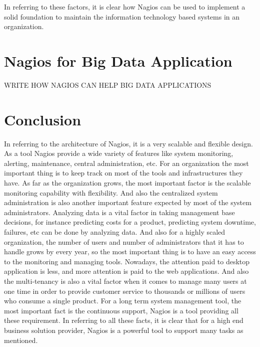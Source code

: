 \documentclass[9pt,twocolumn,twoside]{styles/osajnl}
\begin{document}
In referring to these factors, it is clear how Nagios can be used to
implement a solid foundation to maintain the information technology
based systems in an organization.

\section{Nagios for Big Data Application}

WRITE HOW NAGIOS CAN HELP BIG DATA APPLICATIONS

\section{Conclusion}

In referring to the architecture of Nagios, it is a very scalable and
flexible design. As a tool Nagios provide a wide variety of features
like system monitoring, alerting, maintenance, central administration,
etc. For an organization the most important thing is to keep track on
most of the tools and infrastructures they have. As far as the
organization grows, the most important factor is the scalable
monitoring capability with flexibility. And also the centralized
system administration is also another important feature expected by
most of the system administrators. Analyzing data is a vital factor in
taking management base decisions, for instance predicting costs for a
product, predicting system downtime, failures, etc can be done by
analyzing data. And also for a highly scaled organization, the number
of users and number of administrators that it has to handle grows by
every year, so the most important thing is to have an easy access to
the monitoring and managing tools. Nowadays, the attention paid to
desktop application is less, and more attention is paid to the web
applications. And also the multi-tenancy is also a vital factor when
it comes to manage many users at one time in order to provide customer
service to thousands or millions of users who consume a single
product. For a long term system management tool, the most important
fact is the continuous support, Nagios is a tool providing all these
requirement. In referring to all these facts, it is clear that for a
high end business solution provider, Nagios is a powerful tool to
support many tasks as mentioned.




 
\end{document}
